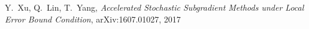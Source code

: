 \documentclass[conference,compsoc]{IEEEtran}
\begin{document}

%
%
%
\begin{thebibliography}{1}

Y.~Xu, Q.~Lin, T.~Yang, \emph{Accelerated Stochastic Subgradient Methods
under Local Error Bound Condition}, arXiv:1607.01027, 2017

\end{thebibliography}




\end{document}
